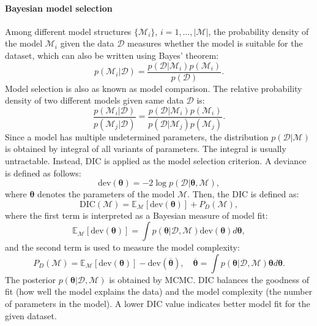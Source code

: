 \paragraph{Bayesian model selection}
Among different model structures $\{\mathcal{M}_i\}$, $i=1,\ldots,|\mathcal{M}|$, the probability density of the model $\mathcal{M}_i$ given the data $\mathcal{D}$ measures whether the model is suitable for the dataset, which can also be written using Bayes’ theorem:
\begin{equation}
    p(\mathcal{M}_i|\mathcal{D})=\frac{p(\mathcal{D}|\mathcal{M}_i)p(\mathcal{M}_i)}{p(\mathcal{D})}.
\end{equation}
Model selection is also as known as model comparison. The relative probability density of two different models given same data $\mathcal{D}$ is:
\begin{equation}
    \frac{p(\mathcal{M}_i|\mathcal{D})}{p(\mathcal{M}_j|\mathcal{D})} = \frac{p(\mathcal{D}|\mathcal{M}_i)p(\mathcal{M}_i)}{p(\mathcal{D}|\mathcal{M}_j)p(\mathcal{M}_j)}.
\end{equation}
Since a model has multiple undetermined parameters, the distribution $p(\mathcal{D}|\mathcal{M})$ is obtained by integral of all variants of parameters. The integral is usually untractable. Instead, \ac{DIC} \citep{Spiegelhalter2002,Spiegelhalter2014, li2025DIC} is applied as the model selection criterion. A deviance is defined as follows:
\begin{equation}
    \text{dev}(\boldsymbol{\theta}) = -2\log p(\mathcal{D}|\boldsymbol{\theta}, \mathcal{M}),
\end{equation}
where $\boldsymbol{\theta}$ denotes the parameters of the model $\mathcal{M}$. Then, the \ac{DIC} is defined as:
\begin{equation}
    \text{DIC}(\mathcal{M}) = \mathbb{E}_{\mathcal{M}}[\text{dev}(\boldsymbol{\theta})] + P_D(\mathcal{M}),
\end{equation}
where the first term is interpreted as a Bayesian measure of model fit:
    \begin{equation}
        \mathbb{E}_{\mathcal{M}}[\text{dev}(\boldsymbol{\theta})] = \int p(\boldsymbol{\theta}|\mathcal{D}, \mathcal{M})\text{dev}(\boldsymbol{\theta})d\boldsymbol{\theta},
    \end{equation}
and the second term is used to measure the model complexity:
    \begin{equation}
        P_D(\mathcal{M}) = \mathbb{E}_{\mathcal{M}}[\text{dev}(\boldsymbol{\theta})] - \text{dev}(\overline{\boldsymbol{\theta}}),\quad \overline{\boldsymbol{\theta}}=\int p(\boldsymbol{\theta}|\mathcal{D},\mathcal{M})\boldsymbol{\theta}d\boldsymbol{\theta}.
    \end{equation}
The posterior $p(\boldsymbol{\theta}|\mathcal{D},\mathcal{M})$ is obtained by \ac{MCMC}.
\ac{DIC} balances the goodness of fit (how well the model explains the data) and the model complexity (the number of parameters in the model). A lower \ac{DIC} value indicates better model fit for the given dataset. 


